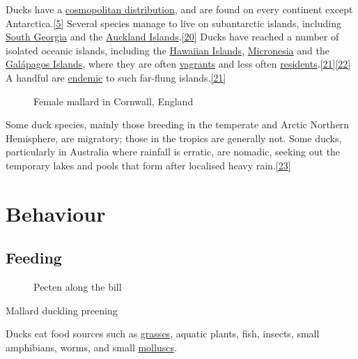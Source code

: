 \documentclass[11pt,a4paper]{article}
\begin{document}
Ducks have a \href{/wiki/Cosmopolitan\_distribution}{cosmopolitan distribution}, and are found on every continent except Antarctica.\href{\#cite\_note-FOOTNOTECarboneras1992536-5}{[5]} Several species manage to live on subantarctic islands, including \href{/wiki/South\_Georgia\_and\_the\_South\_Sandwich\_Islands}{South Georgia} and the \href{/wiki/Auckland\_Islands}{Auckland Islands}.\href{\#cite\_note-FOOTNOTEShirihai2008239,\_245-20}{[20]} Ducks have reached a number of isolated oceanic islands, including the \href{/wiki/Hawaiian\_Islands}{Hawaiian Islands}, \href{/wiki/Micronesia}{Micronesia} and the \href{/wiki/Gal\%C3\%A1pagos\_Islands}{Galápagos Islands}, where they are often \href{/wiki/Glossary\_of\_bird\_terms\#vagrants}{vagrants} and less often \href{/wiki/Glossary\_of\_bird\_terms\#residents}{residents}.\href{\#cite\_note-FOOTNOTEPrattBrunerBerrett198798–107-21}{[21]}\href{\#cite\_note-FOOTNOTEFitterFitterHosking200052–3-22}{[22]} A handful are \href{/wiki/Endemic}{endemic} to such far-flung islands.\href{\#cite\_note-FOOTNOTEPrattBrunerBerrett198798–107-21}{[21]}

\begin{figure}[h]
\caption{Female mallard in Cornwall, England}
\end{figure}

Some duck species, mainly those breeding in the temperate and Arctic Northern Hemisphere, are migratory; those in the tropics are generally not. Some ducks, particularly in Australia where rainfall is erratic, are nomadic, seeking out the temporary lakes and pools that form after localised heavy rain.\href{\#cite\_note-23}{[23]}

\section{Behaviour}

\subsection{Feeding}

\begin{figure}[h]
\caption{Pecten along the bill}
\end{figure}

Mallard duckling preening

Ducks eat food sources such as \href{/wiki/Poaceae}{grasses}, aquatic plants, fish, insects, small amphibians, worms, and small \href{/wiki/Mollusc}{molluscs}.
\end{document}
